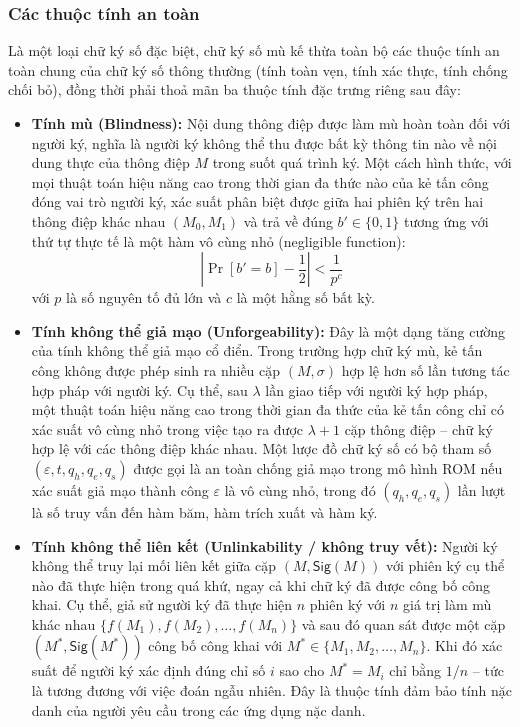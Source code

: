 \subsubsection{Các thuộc tính an toàn}

Là một loại chữ ký số đặc biệt, chữ ký số mù kế thừa toàn bộ các thuộc tính an toàn chung của chữ ký số thông thường (tính toàn vẹn, tính xác thực, tính chống chối bỏ), đồng thời phải thoả mãn ba thuộc tính đặc trưng riêng sau đây:

\begin{itemize}
    \item \textbf{Tính mù (Blindness):} Nội dung thông điệp được làm mù hoàn toàn đối với người ký, nghĩa là người ký không thể thu được bất kỳ thông tin nào về nội dung thực của thông điệp $M$ trong suốt quá trình ký. Một cách hình thức, với mọi thuật toán hiệu năng cao trong thời gian đa thức nào của kẻ tấn công đóng vai trò người ký, xác suất phân biệt được giữa hai phiên ký trên hai thông điệp khác nhau $(M_0, M_1)$ và trả về đúng $b' \in \{0, 1\}$ tương ứng với thứ tự thực tế là một hàm vô cùng nhỏ (negligible function):
    \begin{equation}
        \left| \Pr[b' = b] - \frac{1}{2} \right| < \frac{1}{p^c}
        \label{eq:blindness}
    \end{equation}
    với $p$ là số nguyên tố đủ lớn và $c$ là một hằng số bất kỳ.

    \item \textbf{Tính không thể giả mạo (Unforgeability):} Đây là một dạng tăng cường của tính không thể giả mạo cổ điển. Trong trường hợp chữ ký mù, kẻ tấn công không được phép sinh ra nhiều cặp $(M, \sigma)$ hợp lệ hơn số lần tương tác hợp pháp với người ký. Cụ thể, sau $\lambda$ lần giao tiếp với người ký hợp pháp, một thuật toán hiệu năng cao trong thời gian đa thức của kẻ tấn công chỉ có xác suất vô cùng nhỏ trong việc tạo ra được $\lambda + 1$ cặp thông điệp -- chữ ký hợp lệ với các thông điệp khác nhau. Một lược đồ chữ ký số có bộ tham số $(\varepsilon, t, q_h, q_e, q_s)$ được gọi là an toàn chống giả mạo trong mô hình ROM nếu xác suất giả mạo thành công $\varepsilon$ là vô cùng nhỏ, trong đó $(q_h, q_e, q_s)$ lần lượt là số truy vấn đến hàm băm, hàm trích xuất và hàm ký.

    \item \textbf{Tính không thể liên kết (Unlinkability / không truy vết):} Người ký không thể truy lại mối liên kết giữa cặp $(M, \textsf{Sig}(M))$ với phiên ký cụ thể nào đã thực hiện trong quá khứ, ngay cả khi chữ ký đã được công bố công khai. Cụ thể, giả sử người ký đã thực hiện $n$ phiên ký với $n$ giá trị làm mù khác nhau $\{f(M_1), f(M_2), \ldots, f(M_n)\}$ và sau đó quan sát được một cặp $(M^*, \textsf{Sig}(M^*))$ công bố công khai với $M^* \in \{M_1, M_2, \ldots, M_n\}$. Khi đó xác suất để người ký xác định đúng chỉ số $i$ sao cho $M^* = M_i$ chỉ bằng $1/n$ -- tức là tương đương với việc đoán ngẫu nhiên. Đây là thuộc tính đảm bảo tính nặc danh của người yêu cầu trong các ứng dụng nặc danh.
\end{itemize}

